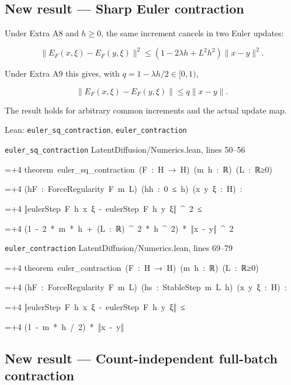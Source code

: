 \documentclass[11pt,a4paper]{report}
\newlength{\leancharwidth}
\newenvironment{leancode}{\par\smallskip\begingroup\ttfamily\footnotesize\raggedright
  \settowidth{\leancharwidth}{M}\setlength{\parskip}{0pt}\setlength{\parindent}{0pt}
  \frenchspacing}{\par\endgroup\smallskip}
\newcommand{\leanline}[2]{\hangindent=\dimexpr#1\leancharwidth+4\leancharwidth\relax
  \hangafter=1\noindent\hspace*{#1\leancharwidth}#2\par}
\newcommand{\leansource}[1]{\par{\footnotesize\color{leanmuted}#1}\par}
\begin{document}
\subsection{\texorpdfstring{New result — Sharp Euler contraction}{New result — Sharp Euler contraction}}



Under Extra A8 and \(h\ge0\), the same increment cancels in two Euler updates:



\[\|E_F(x,\xi)-E_F(y,\xi)\|^2\le(1-2\lambda h+L^2h^2)\|x-y\|^2.\]



Under Extra A9 this gives, with \(q=1-\lambda h/2\in[0,1)\),



\[\|E_F(x,\xi)-E_F(y,\xi)\|\le q\|x-y\|.\]



The result holds for arbitrary common increments and the actual update map.

\begin{leanbox}{Lean: \texttt{euler\_\allowbreak{}sq\_\allowbreak{}contraction}, \texttt{euler\_\allowbreak{}contraction}}
\leansource{\texttt{euler\_\allowbreak{}sq\_\allowbreak{}contraction} \quad LatentDiffusion/\allowbreak{}Numerics.lean, lines 50–56}
\begin{leancode}
\leanline{0}{theorem\ euler\_sq\_contraction\ (F\ :\ H\ →\ H)\ (m\ h\ :\ ℝ)\ (L\ :\ ℝ≥0)}
\leanline{4}{(hF\ :\ ForceRegularity\ F\ m\ L)\ (hh\ :\ 0\ ≤\ h)\ (x\ y\ ξ\ :\ H)\ :}
\leanline{4}{‖eulerStep\ F\ h\ x\ ξ\ -\ eulerStep\ F\ h\ y\ ξ‖\ \textasciicircum{}\ 2\ ≤}
\leanline{6}{(1\ -\ 2\ *\ m\ *\ h\ +\ (L\ :\ ℝ)\ \textasciicircum{}\ 2\ *\ h\ \textasciicircum{}\ 2)\ *\ ‖x\ -\ y‖\ \textasciicircum{}\ 2}
\end{leancode}
\leansource{\texttt{euler\_\allowbreak{}contraction} \quad LatentDiffusion/\allowbreak{}Numerics.lean, lines 69–79}
\begin{leancode}
\leanline{0}{theorem\ euler\_contraction\ (F\ :\ H\ →\ H)\ (m\ h\ :\ ℝ)\ (L\ :\ ℝ≥0)}
\leanline{4}{(hF\ :\ ForceRegularity\ F\ m\ L)\ (hs\ :\ StableStep\ m\ L\ h)\ (x\ y\ ξ\ :\ H)\ :}
\leanline{4}{‖eulerStep\ F\ h\ x\ ξ\ -\ eulerStep\ F\ h\ y\ ξ‖\ ≤}
\leanline{6}{(1\ -\ m\ *\ h\ /\ 2)\ *\ ‖x\ -\ y‖}
\end{leancode}
\end{leanbox}
\subsection{\texorpdfstring{New result — Count-independent full-batch contraction}{New result — Count-independent full-batch contraction}}
\end{document}
